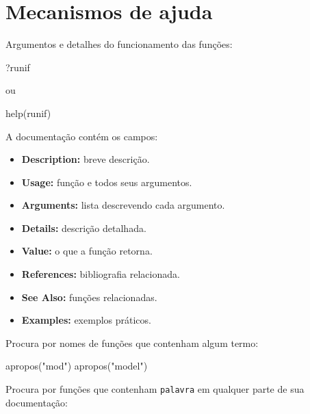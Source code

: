 \documentclass[
  10pt,
  a4paper]{book}
\newenvironment{Shaded}{\begin{snugshade}}{\end{snugshade}}
\newcommand{\FunctionTok}[1]{\textcolor[rgb]{0.00,0.00,0.00}{#1}}
\newcommand{\NormalTok}[1]{#1}
\newcommand{\StringTok}[1]{\textcolor[rgb]{0.31,0.60,0.02}{#1}}
\providecommand{\tightlist}{%
  \setlength{\itemsep}{0pt}\setlength{\parskip}{0pt}}
\begin{document}
\hypertarget{mecanismos-de-ajuda}{%
\section{Mecanismos de ajuda}\label{mecanismos-de-ajuda}}

Argumentos e detalhes do funcionamento das funções:

\begin{Shaded}
\begin{Highlighting}[]
\NormalTok{?runif}
\end{Highlighting}
\end{Shaded}

ou

\begin{Shaded}
\begin{Highlighting}[]
\FunctionTok{help}\NormalTok{(runif)}
\end{Highlighting}
\end{Shaded}

A documentação contém os campos:

\begin{itemize}
\tightlist
\item
  \textbf{Description:} breve descrição.
\item
  \textbf{Usage:} função e todos seus argumentos.
\item
  \textbf{Arguments:} lista descrevendo cada argumento.
\item
  \textbf{Details:} descrição detalhada.
\item
  \textbf{Value:} o que a função retorna.
\item
  \textbf{References:} bibliografia relacionada.
\item
  \textbf{See Also:} funções relacionadas.
\item
  \textbf{Examples:} exemplos práticos.
\end{itemize}

Procura por nomes de funções que contenham algum termo:

\begin{Shaded}
\begin{Highlighting}[]
\FunctionTok{apropos}\NormalTok{(}\StringTok{"mod"}\NormalTok{)}
\FunctionTok{apropos}\NormalTok{(}\StringTok{"model"}\NormalTok{)}
\end{Highlighting}
\end{Shaded}

Procura por funções que contenham \texttt{palavra} em qualquer parte de sua
documentação:
\end{document}
